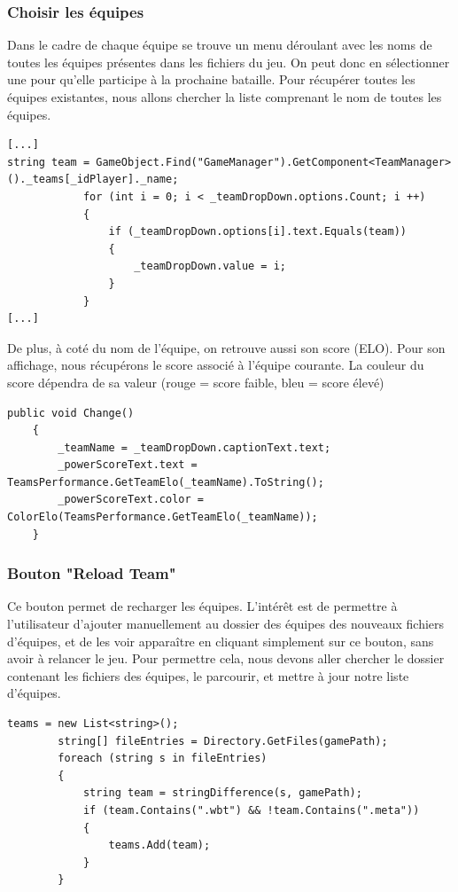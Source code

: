 \documentclass{report}
\begin{document}
\subsubsection{Choisir les équipes}
Dans le cadre de chaque équipe se trouve un menu déroulant avec les noms de toutes les équipes présentes dans les fichiers du jeu. On peut donc en sélectionner une pour qu'elle participe à la prochaine bataille.
Pour récupérer toutes les équipes existantes, nous allons chercher la liste comprenant le nom de toutes les équipes.

\begin{lstlisting}[language={[Sharp]C},label={lst:Start()}, caption= Extrait du code de TeamMenuHUD.cs]
[...]
string team = GameObject.Find("GameManager").GetComponent<TeamManager>()._teams[_idPlayer]._name;
            for (int i = 0; i < _teamDropDown.options.Count; i ++)
            {
                if (_teamDropDown.options[i].text.Equals(team))
                {
                    _teamDropDown.value = i;
                }
            }
[...]
\end{lstlisting}
\smallbreak
De plus, à coté du nom de l'équipe, on retrouve aussi son score (ELO). Pour son affichage, nous récupérons le score associé à l'équipe courante. La couleur du score dépendra de sa valeur (rouge = score faible, bleu = score élevé)

\begin{lstlisting}[language={[Sharp]C},label={lst:Change()}, caption= Extrait du code de TeamMenuHUD.cs]
public void Change()
    {
        _teamName = _teamDropDown.captionText.text;
        _powerScoreText.text = TeamsPerformance.GetTeamElo(_teamName).ToString();
        _powerScoreText.color = ColorElo(TeamsPerformance.GetTeamElo(_teamName));
    }
\end{lstlisting}
\subsubsection{Bouton "Reload Team"}
Ce bouton permet de recharger les équipes. L'intérêt est de permettre à l'utilisateur d'ajouter manuellement au dossier des équipes des nouveaux fichiers d'équipes, et de les voir apparaître en cliquant simplement sur ce bouton, sans avoir à relancer le jeu.
Pour permettre cela, nous devons aller chercher le dossier contenant les fichiers des équipes, le parcourir, et mettre à jour notre liste d'équipes.

\begin{lstlisting}[language={[Sharp]C},label={lst:Updating()}, caption= Extrait du code de GameSettingsScript.cs]
teams = new List<string>();
        string[] fileEntries = Directory.GetFiles(gamePath);
        foreach (string s in fileEntries)
        {
            string team = stringDifference(s, gamePath);
            if (team.Contains(".wbt") && !team.Contains(".meta"))
            {
                teams.Add(team);
            }
        }
\end{lstlisting}
\end{document}
